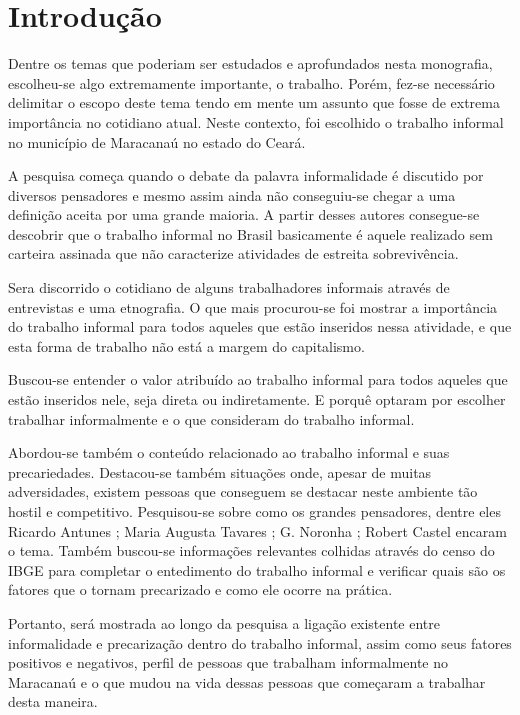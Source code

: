\chapter{Introdução}

Dentre os temas que poderiam ser estudados e aprofundados nesta monografia, escolheu-se algo extremamente importante, o trabalho. Porém, fez-se necessário delimitar o escopo deste tema tendo em mente um assunto que fosse de extrema importância no cotidiano atual. Neste contexto, foi escolhido o trabalho informal no município de Maracanaú no estado do Ceará.

A pesquisa começa quando o debate da palavra informalidade é discutido por diversos pensadores e mesmo assim ainda não conseguiu-se chegar a uma definição aceita por uma grande maioria. A partir desses autores consegue-se descobrir que o trabalho informal no Brasil basicamente é aquele realizado sem carteira assinada que não caracterize atividades de estreita sobrevivência.

Sera discorrido o cotidiano de alguns trabalhadores informais através de entrevistas e uma etnografia. O que mais procurou-se foi mostrar a importância do trabalho informal para todos aqueles que estão inseridos nessa atividade, e que esta forma de trabalho não está a margem do capitalismo.

Buscou-se entender o valor atribuído ao trabalho informal para todos aqueles que estão inseridos nele, seja direta ou indiretamente. E porquê optaram por escolher trabalhar informalmente e o que consideram do trabalho informal.

Abordou-se também o conteúdo relacionado ao trabalho informal e suas precariedades. Destacou-se também situações onde, apesar de muitas adversidades, existem pessoas que conseguem se destacar neste ambiente tão hostil e competitivo. Pesquisou-se sobre como os grandes pensadores, dentre eles Ricardo Antunes \cite{antunes1999sentidos}; Maria Augusta Tavares \cite{augusta}; G. Noronha \cite{noronha2003informal}; Robert Castel \cite{castel1998metamorfoses} encaram o tema. Também buscou-se informações relevantes colhidas através do censo do IBGE para completar o entedimento do trabalho informal e verificar quais são os fatores que o tornam precarizado e como ele ocorre na prática.

Portanto, será mostrada ao longo da pesquisa a ligação existente entre informalidade e precarização dentro do trabalho informal, assim como seus fatores positivos e negativos, perfil de pessoas que trabalham informalmente no Maracanaú e o que mudou na vida dessas pessoas que começaram a trabalhar desta maneira.
